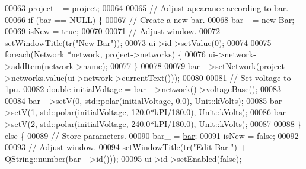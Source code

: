 \begin{DoxyCode}
00063   project\_ = project;
00064 
00065   \textcolor{comment}{// Adjust apearance according to bar.}
00066   \textcolor{keywordflow}{if} (bar == NULL) \{
00067     \textcolor{comment}{// Create a new bar.}
00068     bar\_ = \textcolor{keyword}{new} \hyperlink{class_bar}{Bar};
00069     isNew = \textcolor{keyword}{true};
00070 
00071     \textcolor{comment}{// Adjust window.}
00072     setWindowTitle(tr(\textcolor{stringliteral}{"New Bar"}));
00073     ui->id->setValue(0);
00074 
00075     \textcolor{keywordflow}{foreach}(\hyperlink{class_network}{Network} *network, project->\hyperlink{class_project_aa98126154cab59769a431668e6f17daf}{networks}) \{
00076       ui->network->addItem(network->\hyperlink{class_network_ab6643733a517f930c60b06f5ffd78186}{name});
00077     \}
00078 
00079     bar\_->\hyperlink{group___models_gade9a307fdb6a81871787899ec1af5833}{setNetwork}(project->\hyperlink{class_project_aa98126154cab59769a431668e6f17daf}{networks}.value(ui->network->currentText()));
00080 
00081     \textcolor{comment}{// Set voltage to 1pu.}
00082     \textcolor{keywordtype}{double} initialVoltage = bar\_->\hyperlink{group___models_gab0594d5d7313e8749bb85434b255db9a}{network}()->\hyperlink{group___models_ga88cd2506aaf0b19513e41f00608093e0}{voltageBase}();
00083 
00084     bar\_->\hyperlink{group___models_ga8d1e70b2d11ed4245e81b8b20858079d}{setV}(0, std::polar(initialVoltage, 0.0), \hyperlink{class_unit_a55b07dfa9457e1eca2c7194fe0cfc3c1aa54b2473993a702a3923525765bd6e4c}{Unit::kVolts});
00085     bar\_->\hyperlink{group___models_ga8d1e70b2d11ed4245e81b8b20858079d}{setV}(1, std::polar(initialVoltage, 120.0*\hyperlink{math__constants_8h_a368d99984512d9a6c6f18b37b4446431}{kPI}/180.0), 
      \hyperlink{class_unit_a55b07dfa9457e1eca2c7194fe0cfc3c1aa54b2473993a702a3923525765bd6e4c}{Unit::kVolts});
00086     bar\_->\hyperlink{group___models_ga8d1e70b2d11ed4245e81b8b20858079d}{setV}(2, std::polar(initialVoltage, 240.0*\hyperlink{math__constants_8h_a368d99984512d9a6c6f18b37b4446431}{kPI}/180.0), 
      \hyperlink{class_unit_a55b07dfa9457e1eca2c7194fe0cfc3c1aa54b2473993a702a3923525765bd6e4c}{Unit::kVolts});
00087 
00088   \} \textcolor{keywordflow}{else} \{
00089     \textcolor{comment}{// Store parameters.}
00090     bar\_ = \hyperlink{class_bar_properties_a65d09e7315764cd4ad33b5a0ded32090}{bar};
00091     isNew = \textcolor{keyword}{false};
00092 
00093     \textcolor{comment}{// Adjust window.}
00094     setWindowTitle(tr(\textcolor{stringliteral}{"Edit Bar "}) + QString::number(bar\_->\hyperlink{group___models_gacf0fb781a73856bb7beb823304465e13}{id}()));
00095     ui->id->setEnabled(\textcolor{keyword}{false});

\end{DoxyCode}
